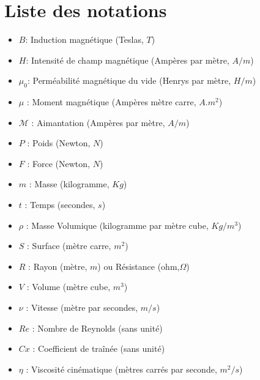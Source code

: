 \documentclass{article}
\begin{document}
\newpage
\tableofcontents %

\newpage
\section*{Liste des notations}
    
    \begin{itemize}
        \item $B$: Induction magnétique (Teslas, $T$)
        \item $H$: Intensité de champ magnétique (Ampères par mètre, $A/m$)
        \item $\mu_0$: Perméabilité magnétique du vide (Henrys par mètre, $H/m$)
        \item $\mu$ : Moment magnétique (Ampères mètre carre, $A.m^2$)
        \item $\mathcal{M}$ : Aimantation (Ampères par mètre, $A/m$)
        \item $P$ : Poids (Newton, $N$)
        \item $F$ : Force (Newton, $N$)
        \item $m$ : Masse (kilogramme, $Kg$)
        \item $t$ : Temps (secondes, $s$)
        \item $\rho$ : Masse Volumique (kilogramme par mètre cube, $Kg/m^3$)
        \item $S$ : Surface (mètre carre, $m^2$)
        \item $R$ : Rayon (mètre, $m$) ou Résistance (ohm,$\Omega$)
        \item $V$ : Volume (mètre cube, $m^3$)
        \item $\nu$ : Vitesse (mètre par secondes, $m/s$)
        \item $Re$ : Nombre de Reynolds  (sans unité)
        \item $Cx$ : Coefficient de traînée  (sans unité)
        \item $\eta$ : Viscosité cinématique  (mètres carrés par seconde, $m^2/s$)
    \end{itemize}

\listoffigures


\newpage
\end{document}
